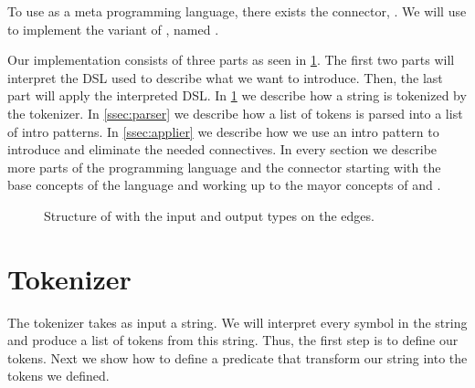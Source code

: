 \documentclass[thesis.tex]{subfiles}
\begin{document}
{To use \elpi as a \coq meta programming language, there exists the \elpi \coq connector, \ce \cite{tassiElpiExtensionLanguage2018}. We will use \ce to implement the \elpi variant of , named .

Our \elpi implementation  consists of three parts as seen in \cref{fig:eiintrosstruct}. The first two parts will interpret the DSL used to describe what we want to introduce. Then, the last part will apply the interpreted DSL. In \cref{ssec:tokenizer} we describe how a string is tokenized by the tokenizer. In \cref{ssec:parser} we describe how a list of tokens is parsed into a list of intro patterns. In \cref{ssec:applier} we describe how we use an intro pattern to introduce and eliminate the needed connectives. In every section we describe more parts of the \elpi programming language and the \ce connector starting with the base concepts of the language and working up to the mayor concepts of \elpi and \ce.
\begin{figure}
  \centering
  \caption{Structure of  with the input and output types on the edges.}
  \label{fig:eiintrosstruct}
\end{figure}

\section{Tokenizer}\label{ssec:tokenizer}
The tokenizer takes as input a string. We will interpret every symbol in the string and produce a list of tokens from this string. Thus, the first step is to define our tokens. Next we show how to define a predicate that transform our string into the tokens we defined.

}
\end{document}
